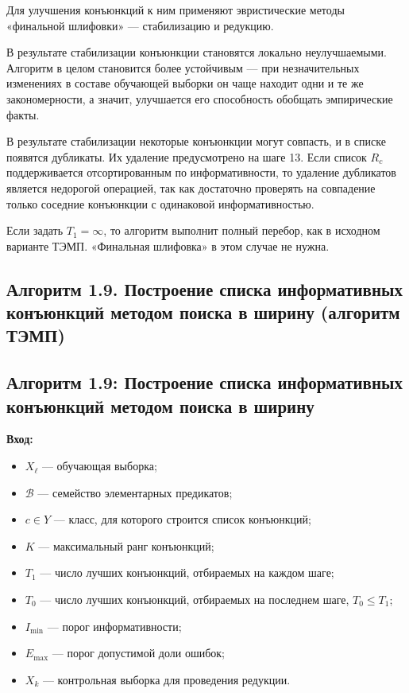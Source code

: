 Для улучшения конъюнкций к ним применяют эвристические методы «финальной шлифовки» — стабилизацию и редукцию.

В результате стабилизации конъюнкции становятся локально неулучшаемыми. Алгоритм в целом становится более устойчивым — при незначительных изменениях в составе обучающей выборки он чаще находит одни и те же закономерности, а значит, улучшается его способность обобщать эмпирические факты.

В результате стабилизации некоторые конъюнкции могут совпасть, и в списке появятся дубликаты. Их удаление предусмотрено на шаге 13. Если список $R_c$ поддерживается отсортированным по информативности, то удаление дубликатов является недорогой операцией, так как достаточно проверять на совпадение только соседние конъюнкции с одинаковой информативностью.

Если задать $T_1 = \infty$, то алгоритм выполнит полный перебор, как в исходном варианте ТЭМП. «Финальная шлифовка» в этом случае не нужна.

\subsection{Алгоритм 1.9. Построение списка информативных конъюнкций методом поиска в ширину (алгоритм ТЭМП)}


\subsection{Алгоритм 1.9: Построение списка информативных конъюнкций методом поиска в ширину}

\textbf{Вход:}
\begin{itemize}
    \item $X_\ell$ --- обучающая выборка;
    \item $\mathcal{B}$ --- семейство элементарных предикатов;
    \item $c \in Y$ --- класс, для которого строится список конъюнкций;
    \item $K$ --- максимальный ранг конъюнкций;
    \item $T_1$ --- число лучших конъюнкций, отбираемых на каждом шаге;
    \item $T_0$ --- число лучших конъюнкций, отбираемых на последнем шаге, $T_0 \leq T_1$;
    \item $I_{\min}$ --- порог информативности;
    \item $E_{\max}$ --- порог допустимой доли ошибок;
    \item $X_k$ --- контрольная выборка для проведения редукции.
\end{itemize}

